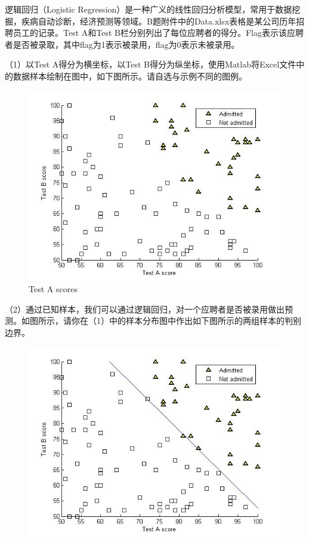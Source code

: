 \documentclass[12pt,a4paper]{article}
\begin{document}
\begin{ACEEproblem}{1.4}{\xiaosihao}{\youyuan}
\begin{spacing}{1.4}
逻辑回归（Logistic Regression）是一种广义的线性回归分析模型，常用于数据挖掘，疾病自动诊断，经济预测等领域。B题附件中的Data.xlsx表格是某公司历年招聘员工的记录。Test A和Test B栏分别列出了每位应聘者的得分。Flag表示该应聘者是否被录取，其中flag为1表示被录用，flag为0表示未被录用。\par
（1）以Test A得分为横坐标，以Test B得分为纵坐标，使用Matlab将Excel文件中的数据样本绘制在图中，如下图所示。请自选与示例不同的图例。\par
\begin{figure}[H]
\small
\centering
\includegraphics[width=12cm]{fig3.jpg}
\caption{Test A scores} \label{fig: area}
\end{figure} 
（2）通过已知样本，我们可以通过逻辑回归，对一个应聘者是否被录用做出预测。如图所示，请你在（1）中的样本分布图中作出如下图所示的两组样本的判别边界。	\par
\begin{figure}[H]
\small
\centering
\includegraphics[width=12cm]{fig33.jpg}

\end{figure}
\end{spacing}
\end{ACEEproblem}
\end{document}
